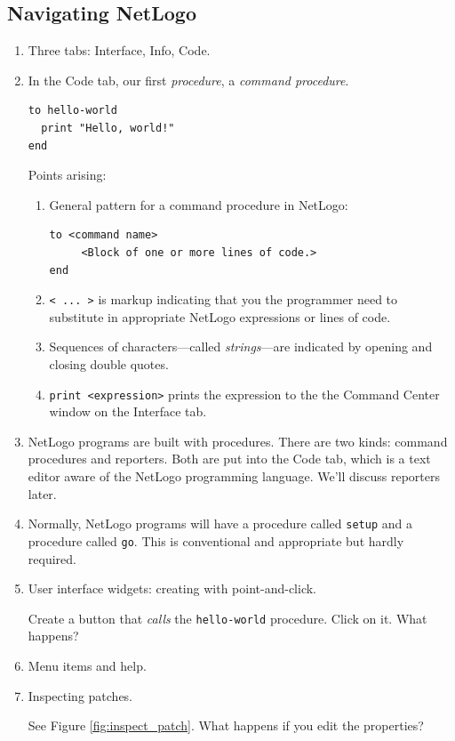 \subsection{Navigating NetLogo}
\begin{enumerate}
\item Three tabs: Interface, Info, Code. 
\item In the Code tab, our first \emph{procedure}, a \emph{command procedure}.
\begin{verbatim}
to hello-world
  print "Hello, world!"
end
\end{verbatim}
Points arising:
\begin{enumerate}
\item General pattern for a command procedure in NetLogo:
\begin{verbatim}
to <command name>
     <Block of one or more lines of code.>
end
\end{verbatim}
\item \verb+< ... >+ is markup indicating that you the programmer need to substitute in appropriate NetLogo expressions or lines of code.
\item Sequences of characters---called \emph{strings}---are indicated by opening and closing double quotes.
\item \verb+print <expression>+ prints the expression to the the Command Center window on the Interface tab.
\end{enumerate}
\item NetLogo programs are built with procedures. There are two kinds: command procedures and reporters. Both are put into the Code tab, which is a text editor aware of the NetLogo programming language. We'll discuss reporters later.
\item Normally, NetLogo programs will have a procedure called \texttt{setup} and a procedure called \texttt{go}. This is conventional and appropriate but hardly required.
\item User interface widgets: creating with point-and-click.

Create a button that \emph{calls} the \texttt{hello-world} procedure. Click on it. What happens?

\item Menu items and help.
\item Inspecting patches.

See Figure \ref{fig:inspect_patch}. What happens if you edit the properties?




\end{enumerate}
